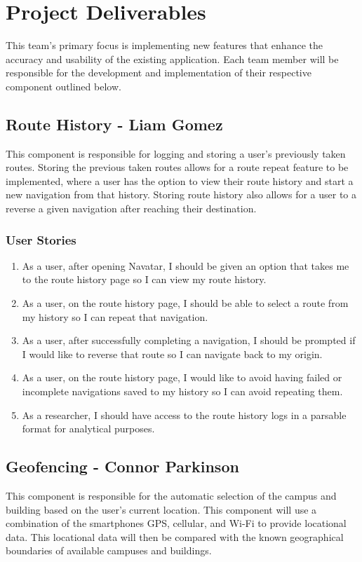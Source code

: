 \documentclass{scrreprt}
\begin{document}
\chapter{Project Deliverables}
This team’s primary focus is implementing new features that enhance the accuracy and usability of the existing application. Each team member will be responsible for the development and implementation of their respective component outlined below.

\section{Route History - Liam Gomez}
This component is responsible for logging and storing a user’s previously taken routes. Storing the previous taken routes allows for a route repeat feature to be implemented, where a user has the option to view their route history and start a new navigation from that history. Storing route history also allows for a user to a reverse a given navigation after reaching their destination.

\subsection{User Stories}
\begin{enumerate}
	\item As a user, after opening Navatar, I should be given an option that takes me to the route history page so I can view my route history.
	\item As a user, on the route history page, I should be able to select a route from my history so I can repeat that navigation.
	\item As a user, after successfully completing a navigation, I should be prompted if I would like to reverse that route so I can navigate back to my origin.
	\item As a user, on the route history page, I would like to avoid having failed or incomplete navigations saved to my history so I can avoid repeating them.
	\item As a researcher, I should have access to the route history logs in a parsable format for analytical purposes.
\end{enumerate}

\section{Geofencing - Connor Parkinson}
This component is responsible for the automatic selection of the campus and building based on the user’s current location. This component will use a combination of the smartphones GPS, cellular, and Wi-Fi to provide locational data. This locational data will then be compared with the known geographical boundaries of available campuses and buildings.
\end{document}
